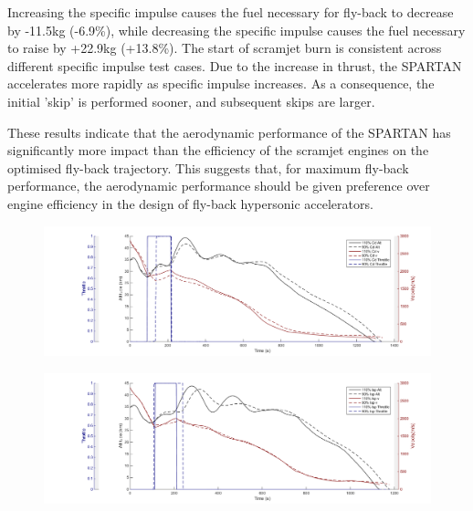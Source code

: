 \documentclass{article}
\begin{document}
Increasing the specific impulse causes the fuel necessary for fly-back to decrease by -11.5kg (-6.9\%), while decreasing the specific impulse causes the fuel necessary to raise by +22.9kg (+13.8\%). The start of scramjet burn is consistent across different specific impulse test cases. Due to the increase in thrust, the SPARTAN accelerates more rapidly as specific impulse increases. As a consequence, the initial 'skip' is performed sooner, and subsequent skips are larger. 

These results indicate that the aerodynamic performance of the SPARTAN has significantly more impact than the efficiency of the scramjet engines on the optimised fly-back trajectory. This suggests that, for maximum fly-back performance, the aerodynamic performance should be given preference over engine efficiency in the design of fly-back hypersonic accelerators. 

\begin{figure}[ht]
\centering
\includegraphics[width=0.9\linewidth]{Figures/CdVariation}
\caption{}
\label{fig:CdVariation}
\end{figure}

\begin{figure}[ht]
\centering
\includegraphics[width=0.9\linewidth]{Figures/IspVariation}
\caption{}
\label{fig:IspVariation}
\end{figure}
\end{document}

